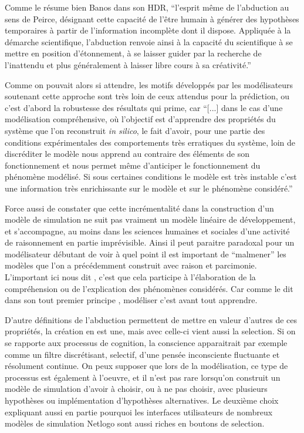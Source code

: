 Comme le résume bien Banos dans son HDR, \enquote{l’esprit même de l’abduction au sens de Peirce, désignant cette capacité de l’être humain à générer des hypothèses temporaires à partir de l’information incomplète dont il dispose. Appliquée à la démarche scientifique, l’abduction renvoie ainsi à la capacité du scientifique à se mettre en position d’étonnement, à se laisser guider par la recherche de l’inattendu et plus généralement à laisser libre cours à sa créativité.} \autocite{Banos2013}

Comme on pouvait alors si attendre, les motifs développés par les modélisateurs soutenant cette approche sont très loin de ceux attendus pour la prédiction, ou c'est d'abord la robustesse des résultats qui prime, car \enquote{[...] dans le cas d’une modélisation compréhensive, où l’objectif est d’apprendre des propriétés du système que l’on reconstruit \textit{in silico}, le fait d’avoir, pour une partie des conditions expérimentales des comportements très erratiques du système, loin de discréditer le modèle nous apprend au contraire des éléments de son fonctionnement et nous permet même d’anticiper le fonctionnement du phénomène modélisé. Si sous certaines conditions le modèle est très instable c’est une information très enrichissante sur le modèle et sur le phénomène considéré.} \autocite{Amblard2010} 

Force aussi de constater que cette incrémentalité dans la construction d'un modèle de simulation ne suit pas vraiment un modèle linéaire de développement, et s'accompagne, au moins dans les sciences humaines et sociales d'une activité de raisonnement en partie imprévisible. Ainsi il peut paraitre paradoxal pour un modélisateur débutant de voir à quel point il est important de \enquote{malmener} les modèles que l'on a précédemment construit avec raison et parcimonie. L'important ici nous dit \textcite{Amblard2010}, c'est que cela participe à l'élaboration de la compréhension ou de l'explication des phénomènes considérés. Car comme le dit dans son tout premier principe \textcite[65]{Banos2013}, modéliser c'est avant tout apprendre.

D'autre définitions de l'abduction  permettent de mettre en valeur d'autres de ces propriétés, la création en est une, mais avec celle-ci vient aussi la selection. Si on se rapporte aux processus de cognition, la conscience apparaitrait par exemple comme un filtre discrétisant, selectif, d'une pensée inconsciente fluctuante et résolument continue. On peux supposer que lors de la modélisation, ce type de processus est également à l'oeuvre, et il n'est pas rare lorsqu'on construit un modèle de simulation d'avoir à choisir, ou à ne pas choisir, avec plusieurs hypothèses ou implémentation d'hypothèses alternatives. Le deuxième choix expliquant aussi en partie pourquoi les interfaces utilisateurs de nombreux modèles de simulation Netlogo sont aussi riches en boutons de selection.

